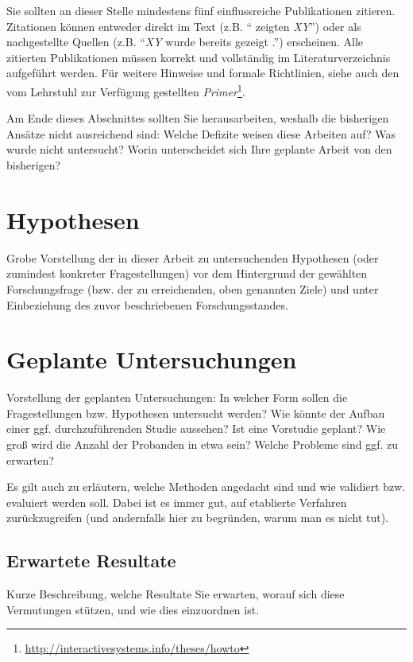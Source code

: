 \documentclass[ngerman, a4paper, abstract=false, twoside=false, parskip=half, DIV=12, bibtotoc]{scrartcl}
\begin{document}
Sie sollten an dieser Stelle mindestens fünf einflussreiche Publikationen zitieren. Zitationen können entweder direkt im Text (z.B. \enquote{\citet{Zobel:2004} zeigten \emph{XY}}) oder als nachgestellte Quellen (z.B. \enquote{\emph{XY} wurde bereits gezeigt \citep{Zobel:2004}.}) erscheinen. Alle zitierten Publikationen müssen korrekt und vollständig im Literaturverzeichnis aufgeführt werden. Für weitere Hinweise und formale Richtlinien, siehe auch den vom Lehrstuhl zur Verfügung gestellten \emph{Primer}\footnote{\url{http://interactivesystems.info/theses/howto}}.

Am Ende dieses Abschnittes sollten Sie herausarbeiten, weshalb die bisherigen Ansätze nicht ausreichend sind: Welche Defizite weisen diese Arbeiten auf? Was wurde nicht untersucht? Worin unterscheidet sich Ihre geplante Arbeit von den bisherigen?


\section{Hypothesen}
Grobe Vorstellung der in dieser Arbeit zu untersuchenden Hypothesen (oder zumindest konkreter Fragestellungen) vor dem Hintergrund der gewählten Forschungsfrage (bzw. der zu erreichenden, oben genannten Ziele) und unter Einbeziehung des zuvor beschriebenen Forschungsstandes.


\section{Geplante Untersuchungen}
Vorstellung der geplanten Untersuchungen: In welcher Form sollen die Fragestellungen bzw. Hypothesen untersucht werden? Wie könnte der Aufbau einer ggf. durchzuführenden Studie aussehen? Ist eine Vorstudie geplant? Wie groß wird die Anzahl der Probanden in etwa sein? Welche Probleme sind ggf. zu erwarten?

Es gilt auch zu erläutern, welche Methoden angedacht sind und wie validiert bzw. evaluiert werden soll. Dabei ist es immer gut, auf etablierte Verfahren zurückzugreifen (und andernfalls hier zu begründen, warum man es nicht tut).

\subsection{Erwartete Resultate}
Kurze Beschreibung, welche Resultate Sie erwarten, worauf sich diese Vermutungen stützen, und wie dies einzuordnen ist.




\end{document}
